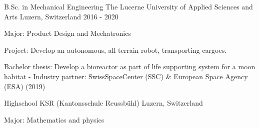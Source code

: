 

\begin{cventries}

\cventry
{B.Sc. in Mechanical Engineering} %
{The Lucerne University of Applied Sciences and Arts} %
{Luzern, Switzerland} %
{2016 - 2020} %
{
	\begin{cvitems} %
		\item {Major: Product Design and Mechatronics}
		\item {Project: Develop an autonomous, all-terrain robot, transporting cargoes.}
		\item {Bachelor thesis: Develop a bioreactor as part of life supporting system for a moon habitat - \newline Industry partner: \mbox{SwissSpaceCenter} (SSC) \& European Space Agency (ESA) (2019)}
	\end{cvitems}
}



  \cventry
    {Highschool} %
    {KSR (Kantonsschule Reussbühl)} %
    {Luzern, Switzerland} %
    {} %
    {
      \begin{cvitems} %
        \item {Major: Mathematics and physics}
      \end{cvitems}
    }

\end{cventries}
